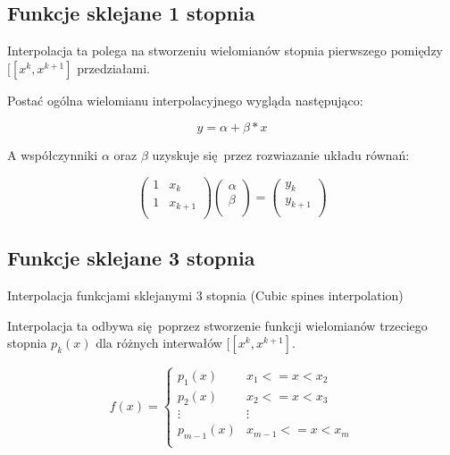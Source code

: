 \documentclass[varwidth,12pt,a4paper]{article}
\begin{document}
\subsection{Funkcje sklejane 1 stopnia}

Interpolacja ta polega na stworzeniu wielomianów stopnia pierwszego pomiędzy $ [[x^k, x^{k+1}] $ przedziałami.

Postać ogólna wielomianu interpolacyjnego wygląda następująco:

\begin{equation}
    y = \alpha + \beta * x
\end{equation}

A współczynniki $\alpha$ oraz $\beta$ uzyskuje się przez rozwiazanie układu równań:

$$
\left( \begin{array}{cc}
    1 & x_k \\
    1 & x_{k + 1} \\
\end{array} \right) \left( \begin{array}{c}
\alpha\\
\beta \\
\end{array} \right) = \left( \begin{array}{c}
    y_k \\
    y_{k + 1} \\
\end{array} \right) 
$$



\subsection{Funkcje sklejane 3 stopnia}

Interpolacja funkcjami sklejanymi 3 stopnia (Cubic spines interpolation)

Interpolacja ta odbywa się poprzez stworzenie funkcji wielomianów trzeciego stopnia $ p_k(x) $
dla różnych interwałów $ [[x^k, x^{k+1}] $.

$$
    f(x) = \left\{ \begin{array}{ll}
    p_1 (x) & \textrm{$x_1 <= x < x_2$}\\
    p_2 (x) & \textrm{$x_2 <= x < x_3$}\\
    \vdots  & \vdots \\
    p_{m-1} (x) & \textrm{$x_{m-1} <= x < x_m$}\\
    \end{array} \right.
$$
\end{document}
